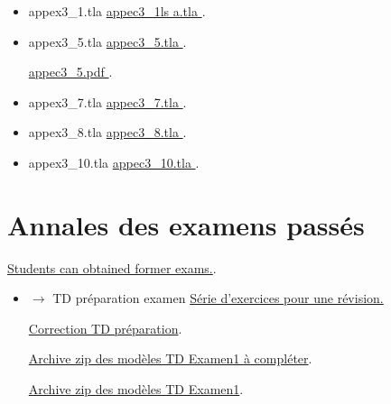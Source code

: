 \documentclass[ 12pt]{article}
\begin{document}
\begin{itemize}

  \item[]   appex3\_1.tla 
    \href{http://mery54.github.io/teaching/mvsi/models/appex3_1.tla}{
      appec3\_1ls a.tla }.

    
  \item[]   appex3\_5.tla 
    \href{http://mery54.github.io/teaching/mvsi/models/appex3_5.tla}{
      appec3\_5.tla }.

       \href{http://mery54.github.io/teaching/mvsi/models/appex3_5.pdf}{
      appec3\_5.pdf }.

      \item[]   appex3\_7.tla 
        \href{http://mery54.github.io/teaching/mvsi/models/appex3_7.tla}{
          appec3\_7.tla }.

              \item[]   appex3\_8.tla 
        \href{http://mery54.github.io/teaching/mvsi/models/appex3_8.tla}{
          appec3\_8.tla }.

              \item[]   appex3\_10.tla 
        \href{http://mery54.github.io/teaching/mvsi/models/appex3_10.tla}{
          appec3\_10.tla }.
        
   \end{itemize}


\section{Annales   des examens passés}

\href{http://mery54.github.io/teaching/mvsi/lecturesnotes/mvsi-annales.pdf}{Students
  can obtained former  exams.}.



\begin{itemize}

                    
        \item[] $\longrightarrow$   TD  préparation examen
    \href{http://mery54.github.io/teaching/mvsi/lecturesnotes/newtdexamen1.pdf}{Série
      d'exercices   pour une révision.}   

          \href{http://mery54.github.io/teaching/mvsi/lecturesnotes/cnewtdexamen1.pdf}{Correction 
            TD préparation}.

            \href{http://mery54.github.io/teaching/mvsi/models/td-examen1.zip}{Archive 
              zip  des modèles   TD Examen1 à compléter}.
            

                    \href{http://mery54.github.io/teaching/mvsi/models/tdexamen1-models.zip}{Archive 
                      zip  des modèles   TD Examen1}.
          
\end{itemize}
   



\end{document}
